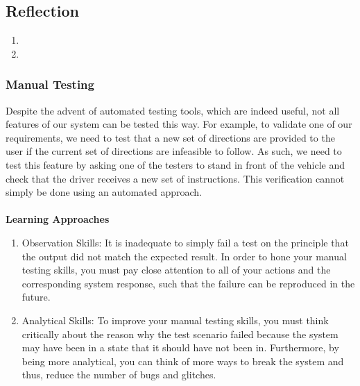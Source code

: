 \documentclass[12pt, titlepage]{article}
\begin{document}
\newpage{}
\subsection{Reflection}



\begin{enumerate}
  \item {}

  \item {}
\end{enumerate}

\subsubsection{Manual Testing}
Despite the advent of automated testing tools, which are indeed useful, not all
features of our system can be tested this way. For example, to validate one of
our requirements, we need to test that a new set of directions are provided to
the user if the current set of directions are infeasible to follow. As such, we
need to test this feature by asking one of the testers to stand in front of the
vehicle and check that the driver receives a new set of instructions. This
verification cannot simply be done using an automated approach. \\
\\
\noindent \textbf{Learning Approaches}
\begin{enumerate}
    \item Observation Skills: It is inadequate to simply fail a test on the
    principle that the output did not match the expected result. In order to
    hone your manual testing skills, you must pay close attention to all of your
    actions and the corresponding system response, such that the failure can be
    reproduced in the future.
    \item Analytical Skills: To improve your manual testing skills, you must
    think critically about the reason why the test scenario failed because the
    system may have been in a state that it should have not been in.
    Furthermore, by being more analytical, you can think of more ways to break
    the system and thus, reduce the number of bugs and glitches.
\end{enumerate}
\end{document}
